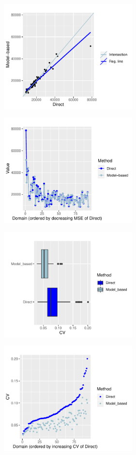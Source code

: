 \begin{figure}[h!]
	\centering
	\begin{subfigure}{0.48\textwidth}
		\includegraphics[width=7cm, keepaspectratio]{./figures/compare1}
		\caption{}
		\label{fig:comparea}
	\end{subfigure}
	\begin{subfigure}{0.48\textwidth}
		\includegraphics[width=7cm, keepaspectratio]{./figures/compare2}
		\caption{}
		\label{fig:compareb}
	\end{subfigure}
	\begin{subfigure}{0.48\textwidth}
		\includegraphics[width=7cm, keepaspectratio]{./figures/compare5}
		\caption{}
		\label{fig:comparee}
	\end{subfigure}
	\begin{subfigure}{0.48\textwidth}
		\includegraphics[width=7cm, keepaspectratio]{./figures/compare6}

\end{subfigure}
\end{figure}

